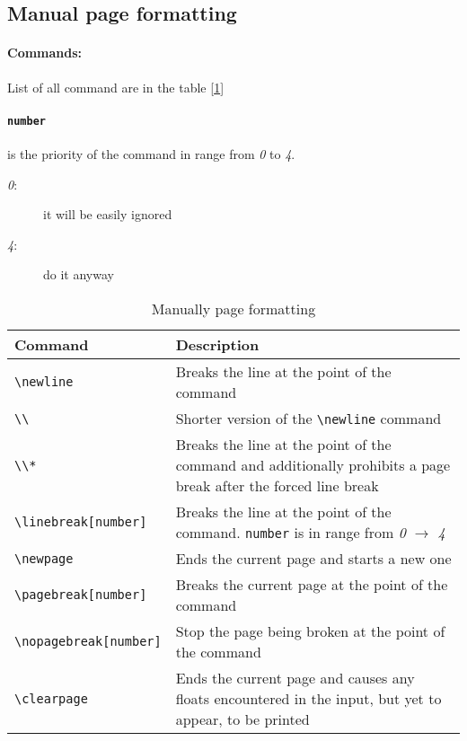 \subsection{Manual page formatting}

\paragraph{Commands:} List of all command are in the table [\ref{manuallyformat}]

\paragraph{\texttt{number}} is the priority of the command in range from \emph{0} to \emph{4}.
\begin{description}
	\item[\emph{0}:] it will be easily ignored
	\item[\emph{4}:] do it anyway
\end{description}
\begin{table}[!htbp]
	\centering
	\begin{tabular}{ l @{ } p{7.5cm} }
		\toprule
		\textbf{Command} & \textbf{Description} \\ \midrule
		\verb|\newline| & Breaks the line at the point of the command \\ \hline
		\verb|\\| & Shorter version of the \verb|\newline| command \\ \hline
		\verb|\\*| & Breaks the line at the point of the command and additionally
		prohibits a page break after the forced line break \\ \hline
		\verb|\linebreak[number]| & Breaks the line at the point of the command.
		\texttt{number} is in range from \emph{0} $\rightarrow$ \emph{4} \\ \hline
		\verb|\newpage| & Ends the current page and starts a new one \\ \hline
		\verb|\pagebreak[number]| & Breaks the current page at the point of the command \\ \hline
		\verb|\nopagebreak[number]| & Stop the page being broken at the point of the command \\ \hline
		\verb|\clearpage| & Ends the current page and causes any floats encountered in the input, but
		yet to appear, to be printed \\ \bottomrule
	\end{tabular}
	\caption{Manually page formatting}
	\label{manuallyformat}
\end{table}

